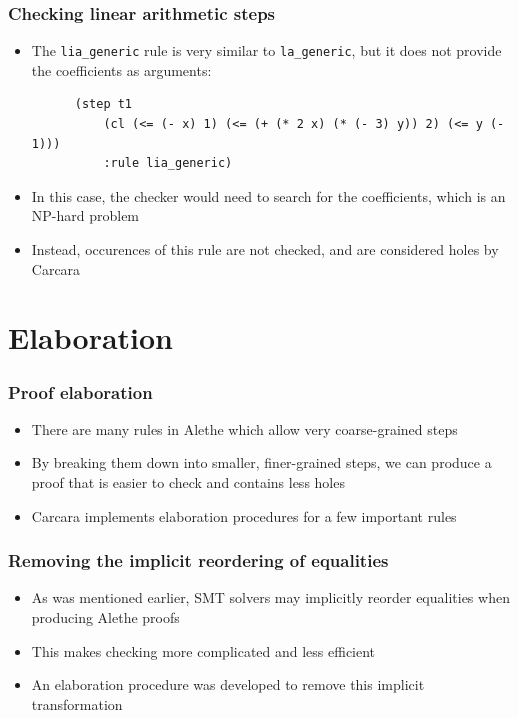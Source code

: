 \documentclass[usepdftitle=false,aspectratio=169]{beamer}
\newcommand\vitem{\vfill\item}
\begin{document}
\begin{frame}[fragile]
  \frametitle{Checking linear arithmetic steps}
  \begin{itemize}
    \item The \texttt{lia\_generic} rule is very similar to
    \texttt{la\_generic}, but it does not provide the coefficients as arguments:
    \begin{verbatim}
      (step t1
          (cl (<= (- x) 1) (<= (+ (* 2 x) (* (- 3) y)) 2) (<= y (- 1)))
          :rule lia_generic)
    \end{verbatim}
    \vitem In this case, the checker would need to search for the coefficients,
    which is an NP-hard problem
    \vitem Instead, occurences of this rule are not checked, and are considered
    holes by Carcara
  \end{itemize}
\end{frame}

\section{Elaboration}

\begin{frame}
  \frametitle{Proof elaboration}
  \begin{itemize}
    \item There are many rules in Alethe which allow very coarse-grained steps
    \vitem By breaking them down into smaller, finer-grained steps, we can
    produce a proof that is easier to check and contains less holes
    \vitem Carcara implements elaboration procedures for a few important rules
  \end{itemize}
\end{frame}

\begin{frame}
  \frametitle{Removing the implicit reordering of equalities}
  \begin{itemize}
    \item As was mentioned earlier, SMT solvers may implicitly reorder
    equalities when producing Alethe proofs
    \vitem This makes checking more complicated and less efficient
    \vitem An elaboration procedure was developed to remove this implicit
    transformation
  \end{itemize}
\end{frame}
\end{document}

